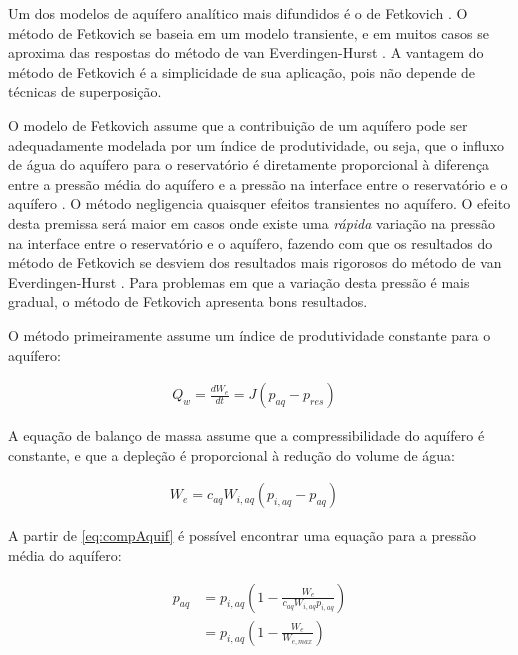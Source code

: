 \documentclass[final,5p]{elsarticle}
\numberwithin{equation}{section}
\begin{document}
        Um dos modelos de aquífero analítico mais difundidos é o de Fetkovich \cite{schlumberger2009technical} \cite{computer2022cmg} \cite{rosa2006engenharia}. O método de Fetkovich se baseia em um modelo transiente, e em muitos casos se aproxima das respostas do método de van Everdingen-Hurst \cite{VanEverdingen-Hurst}. A vantagem do método de Fetkovich é a simplicidade de sua aplicação, pois não depende de técnicas de superposição.

        O modelo de Fetkovich assume que a contribuição de um aquífero pode ser adequadamente modelada por um índice de produtividade, ou seja, que o influxo de água do aquífero para o reservatório é diretamente proporcional à diferença entre a pressão média do aquífero e a pressão na interface entre o reservatório e o aquífero \cite{fetkovich1971simplified}. O método negligencia quaisquer efeitos transientes no aquífero. O efeito desta premissa será maior em casos onde existe uma \emph{rápida} variação na pressão na interface entre o reservatório e o aquífero, fazendo com que os resultados do método de Fetkovich se desviem dos resultados mais rigorosos do método de van Everdingen-Hurst \cite{AHMED2019663}. Para problemas em que a variação desta pressão é mais gradual, o método de Fetkovich apresenta bons resultados.

        O método primeiramente assume um índice de produtividade constante para o aquífero:

        \begin{align}
            Q_w = \frac{dW_e}{dt} = J (p_{aq} - p_{res})& \label{eq:j}
        \end{align}

        A equação de balanço de massa assume que a compressibilidade do aquífero é constante, e que a depleção é proporcional à redução do volume de água:

        \begin{align}
            W_e = c_{aq} W_{i,aq} (p_{i,aq} - p_{aq})& \label{eq:compAquif}
        \end{align}

        A partir de \ref{eq:compAquif} é possível encontrar uma equação para a pressão média do aquífero:

        \begin{align}
            p_{aq} &= p_{i,aq} \left( 1 - \frac{W_e}{c_{aq} W_{i,aq} p_{i,aq}} \right) \nonumber \\
            &= p_{i,aq} \left( 1 - \frac{W_e}{W_{e,max}} \right) \label{eq:pAquif}
        \end{align}
\end{document}
